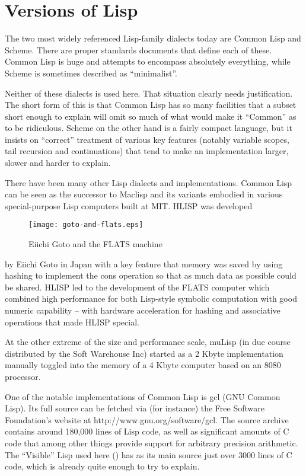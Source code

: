\chapter{Versions of Lisp}
The two most widely referenced Lisp-family dialects today are
Common Lisp\cite{ANSILisp} and Scheme\cite{Scheme}. There are
proper standards documents that define each of these. Common Lisp is
huge and attempts to encompass absolutely everything, while Scheme is
sometimes described as ``minimalist''. 

Neither of these dialects is used here. That situation clearly needs
justification. The short form of this is that Common Lisp has so many
facilities that a subset short enough to explain will omit so much of
what would make it ``Common'' as to be ridiculous.
Scheme on the other hand is a fairly compact language, but it insists
on ``correct'' treatment of various key features (notably variable scopes,
tail recursion and continuations) that tend to make an implementation
larger, slower and harder to explain.

There have been many other Lisp dialects and implementations. Common Lisp
can be seen as the successor to Maclisp and its variants embodied in various
special-purpose Lisp computers built at MIT. HLISP\cite{hlisp} was developed
\begin{wrapfigure}{r}{3.5in}
{\centering
\texttt{[image: goto-and-flats.eps]}}
\caption{Eiichi Goto and the FLATS machine}
\end{wrapfigure} by Eiichi Goto in Japan with a key feature that memory was saved by using
hashing to implement the {\tx cons} operation so that as much data as
possible could be shared. HLISP led to the development of the FLATS\cite{flats}
computer which combined high performance for both Lisp-style symbolic
computation with good numeric capability -- with hardware acceleration for
hashing and associative operations that made HLISP special.

At the other extreme of the size and performance scale, muLisp (in
due course distributed by the Soft Warehouse Inc) started as a 2 Kbyte
implementation manually toggled into the memory of a 4 Kbyte computer
based on an 8080 processor\cite{Imsai}.



One of the notable implementations of Common Lisp is {\tx gcl} (GNU Common
Lisp). Its full source can be fetched via (for instance) the Free
Software Foundation's website at
{\tx http://www.gnu.org/software/gcl}. The source archive
contains around 180,000 lines of Lisp code, as well as significant amounts
of C code that among other things provide support for arbitrary precision
arithmetic. The ``Visible'' Lisp used here (\vsl) has as its main
source just over 3000 lines of C code, which is already quite enough to
try to explain.

